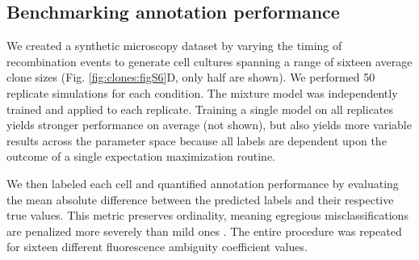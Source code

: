 \subsection{Benchmarking annotation performance}
\label{appendix:methods:clones:benchmarking}

We created a synthetic microscopy dataset by varying the timing of recombination events to generate cell cultures spanning a range of sixteen average clone sizes (Fig. \ref{fig:clones:figS6}D, only half are shown). We performed 50 replicate simulations for each condition. The mixture model was independently trained and applied to each replicate. Training a single model on all replicates yields stronger performance on average (not shown), but also yields more variable results across the parameter space because all labels are dependent upon the outcome of a single expectation maximization routine.

We then labeled each cell and quantified annotation performance by evaluating the mean absolute difference between the predicted labels and their respective true values. This metric preserves ordinality, meaning egregious misclassifications are penalized more severely than mild ones \cite{Gaudette2009}. The entire procedure was repeated for sixteen different fluorescence ambiguity coefficient values.